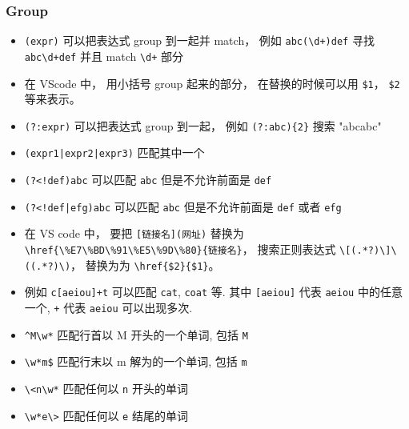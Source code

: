 \subsubsection{Group}
\begin{itemize}
\item \verb|(expr)| 可以把表达式 group 到一起并 match， 例如 \verb|abc(\d+)def| 寻找 \verb|abc\d+def| 并且 match \verb|\d+| 部分
\item 在 VScode 中， 用小括号 group 起来的部分， 在替换的时候可以用 \verb|$1|， \verb|$2| 等来表示。
\item \verb|(?:expr)| 可以把表达式 group 到一起， 例如 \verb|(?:abc){2}| 搜索 "abcabc"
\item \verb`(expr1|expr2|expr3)` 匹配其中一个
\item \verb`(?<!def)abc` 可以匹配 \verb|abc| 但是不允许前面是 \verb|def|
\item \verb`(?<!def|efg)abc` 可以匹配 \verb|abc| 但是不允许前面是 \verb|def| 或者 \verb|efg|
\end{itemize}

\begin{example}{}
\begin{itemize}
\item 在 VS code 中， 要把 \verb|[链接名](网址)| 替换为 \verb|\href{\%E7\%BD\%91\%E5\%9D\%80}{链接名}|， 搜索正则表达式 \verb|\[(.*?)\]\((.*?)\)|， 替换为为 \verb|\href{$2}{$1}|。
\item 例如 \verb`c[aeiou]+t` 可以匹配 \verb`cat`, \verb`coat` 等. 其中 \verb`[aeiou]` 代表 \verb`aeiou` 中的任意一个, \verb`+` 代表 \verb`aeiou` 可以出现多次.
\item \verb`^M\w*` 匹配行首以 M 开头的一个单词, 包括 \verb`M`
\item \verb`\w*m$` 匹配行末以 m 解为的一个单词, 包括 \verb`m`
\item \verb`\<n\w*` 匹配任何以 \verb`n` 开头的单词
\item \verb`\w*e\>` 匹配任何以 \verb`e` 结尾的单词
\end{itemize}
\end{example}
